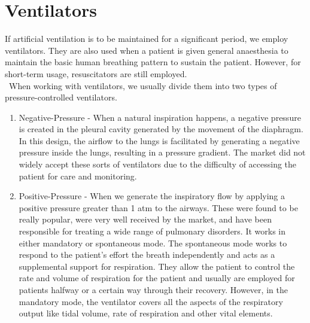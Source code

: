 \documentclass{article}
\begin{document}
\section{Ventilators}
If artificial ventilation is to be maintained for a significant period, we employ ventilators.  They are also used when a patient is given general anaesthesia to maintain the basic human breathing pattern to sustain the patient. However, for short-term usage, resuscitators are still employed. \\\
When working with ventilators, we usually divide them into two types of pressure-controlled ventilators.
\begin{enumerate}
    \item Negative-Pressure - When a natural inspiration happens, a negative pressure is created in the pleural cavity generated by the movement of the diaphragm. In this design, the airflow to the lungs is facilitated by generating a negative pressure inside the lungs, resulting in a pressure gradient. The market did not widely accept these sorts of ventilators due to the difficulty of accessing the patient for care and monitoring.
    \item Positive-Pressure - When we generate the inspiratory flow by applying a positive pressure greater than 1 atm to the airways. These were found to be really popular, were very well received by the market, and have been responsible for treating a wide range of pulmonary disorders. It works in either mandatory or spontaneous mode. The spontaneous mode works to respond to the patient's effort the breath independently and acts as a supplemental support for respiration. They allow the patient to control the rate and volume of respiration for the patient and usually are employed for patients halfway or a certain way through their recovery. However, in the mandatory mode, the ventilator covers all the aspects of the respiratory output like tidal volume, rate of respiration and other vital elements.
\end{enumerate}
\end{document}
